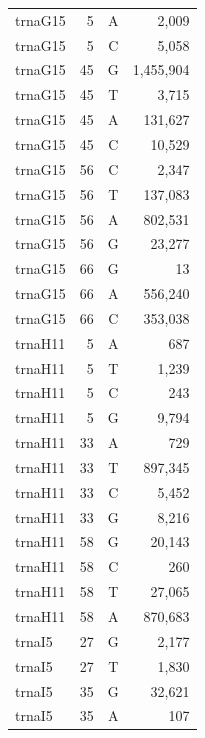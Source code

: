 \documentclass[12pt]{rockefeller}
\begin{document}
{\begin{center}
\begin{supertabular}{|l|r|c|r|}
 trnaG15 &         5 &          A &      2,009 \\
 trnaG15 &         5 &          C &      5,058 \\
 trnaG15 &        45 &          G &  1,455,904 \\
 trnaG15 &        45 &          T &      3,715 \\
 trnaG15 &        45 &          A &    131,627 \\
 trnaG15 &        45 &          C &     10,529 \\
 trnaG15 &        56 &          C &      2,347 \\
 trnaG15 &        56 &          T &    137,083 \\
 trnaG15 &        56 &          A &    802,531 \\
 trnaG15 &        56 &          G &     23,277 \\
 trnaG15 &        66 &          G &         13 \\
 trnaG15 &        66 &          A &    556,240 \\
 trnaG15 &        66 &          C &    353,038 \\
 trnaH11 &         5 &          A &        687 \\
 trnaH11 &         5 &          T &      1,239 \\
 trnaH11 &         5 &          C &        243 \\
 trnaH11 &         5 &          G &      9,794 \\
 trnaH11 &        33 &          A &        729 \\
 trnaH11 &        33 &          T &    897,345 \\
 trnaH11 &        33 &          C &      5,452 \\
 trnaH11 &        33 &          G &      8,216 \\
 trnaH11 &        58 &          G &     20,143 \\
 trnaH11 &        58 &          C &        260 \\
 trnaH11 &        58 &          T &     27,065 \\
 trnaH11 &        58 &          A &    870,683 \\
  trnaI5 &        27 &          G &      2,177 \\
  trnaI5 &        27 &          T &      1,830 \\
  trnaI5 &        35 &          G &     32,621 \\
  trnaI5 &        35 &          A &        107 \\

\end{supertabular}
\end{center}}
\end{document}
